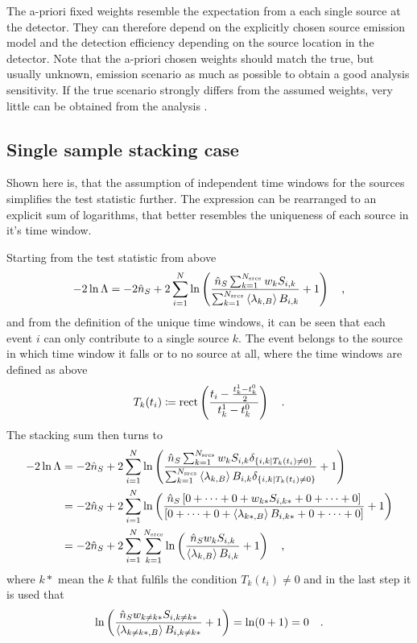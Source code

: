 The a-priori fixed weights resemble the expectation from a each single source at the detector.
They can therefore depend on the explicitly chosen source emission model and the detection efficiency depending on the source location in the detector.
Note that the a-priori chosen weights should match the true, but usually unknown, emission scenario as much as possible to obtain a good analysis sensitivity.
If the true scenario strongly differs from the assumed weights, very little can be obtained from the analysis .


\subsection{Single sample stacking case}
Shown here is, that the assumption of independent time windows for the sources simplifies the test statistic further.
The expression can be rearranged to an explicit sum of logarithms, that better resembles the uniqueness of each source in it's time window.

Starting from the test statistic from above
\begin{equation}
  -2\ln\Lambda
  = -2\hat{n}_S +
      2\sum_{i=1}^N \ln\left(
        \frac{\hat{n}_S \sum_{k=1}^{N_\text{srcs}} w_k S_{i,k}}
             {\sum_{k=1}^{N_\text{srcs}}\Braket{\lambda_{k,B}} B_{i,k}}
        + 1
      \right)
  \quad\text{,}
\end{equation}
and from the definition of the unique time windows, it can be seen that each event $i$ can only contribute to a single source $k$.
The event belongs to the source in which time window it falls or to no source at all, where the time windows are defined as above
\begin{equation}
  T_k(t_i) \coloneqq \operatorname{rect} \left(
    \frac{t_i - \frac{t_k^1-t_k^0}{2}} {t_k^1-t_k^0}
  \right)
  \quad\text{.}
\end{equation}
The stacking sum then turns to
\begin{align}
  -2\ln\Lambda
  &= -2\hat{n}_S +
      2\sum_{i=1}^N \ln\left(
        \frac{\hat{n}_S \sum_{k=1}^{N_\text{srcs}} w_k S_{i,k}
              \delta_{\{i,k|T_k(t_i)\neq 0\}}}
             {\sum_{k=1}^{N_\text{srcs}}\Braket{\lambda_{k,B}} B_{i,k}
              \delta_{\{i,k|T_k(t_i)\neq 0\}}}
        + 1
      \right) \\
  &= -2\hat{n}_S +
      2\sum_{i=1}^N \ln\left(
        \frac{\hat{n}_S \left[0+\dots+0+ w_{k*} S_{i,k*} +0+\dots+0\right]}
             {\left[
              0+\dots+0+ \Braket{\lambda_{k*,B}} B_{i,k*} +0+\dots+0
              \right]}
        + 1
      \right) \\
  &= -2\hat{n}_S +
      2\sum_{i=1}^N \sum_{k=1}^{N_\text{srcs}} \ln\left(
        \frac{\hat{n}_S w_k S_{i,k}}{\Braket{\lambda_{k,B}} B_{i,k}}
        + 1
      \right) \quad\text{,}
\end{align}
where $k*$ mean the $k$ that fulfils the condition $T_k(t_i)\neq 0$ and in the last step it is used that
\begin{equation}
   \ln\left(
      \frac{\hat{n}_S w_{k\neq k*} S_{i,k\neq k*}}{\Braket{\lambda_{k\neq k*,B}} B_{i,k\neq k*}}
      + 1 \right) = \ln(0 + 1) = 0
      \quad\text{.}
\end{equation}

